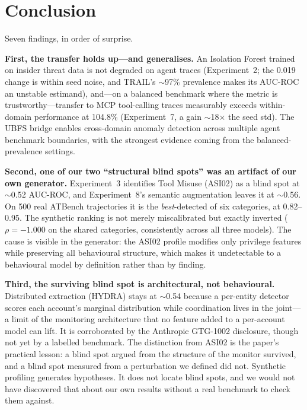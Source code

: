 \documentclass[conference]{IEEEtran}
\begin{document}
\section{Conclusion}
\label{sec:conclusion}

Seven findings, in order of surprise.

\textbf{First, the transfer holds up---and generalises.} An Isolation Forest trained on insider threat data is not degraded on agent traces (Experiment~2; the 0.019 change is within seed noise, and TRAIL's ${\sim}$97\% prevalence makes its AUC-ROC an unstable estimand), and---on a balanced benchmark where the metric is trustworthy---transfer to MCP tool-calling traces measurably exceeds within-domain performance at 104.8\% (Experiment~7, a gain ${\sim}$18$\times$ the seed std). The UBFS bridge enables cross-domain anomaly detection across multiple agent benchmark boundaries, with the strongest evidence coming from the balanced-prevalence settings.

\textbf{Second, one of our two ``structural blind spots'' was an artifact of our own generator.} Experiment~3 identifies Tool Misuse (ASI02) as a blind spot at ${\sim}$0.52 AUC-ROC, and Experiment~8's semantic augmentation leaves it at ${\sim}$0.56. On 500 real ATBench trajectories it is the \emph{best}-detected of six categories, at 0.82--0.95. The synthetic ranking is not merely miscalibrated but exactly inverted ($\rho = -1.000$ on the shared categories, consistently across all three models). The cause is visible in the generator: the ASI02 profile modifies only privilege features while preserving all behavioural structure, which makes it undetectable to a behavioural model by definition rather than by finding.

\textbf{Third, the surviving blind spot is architectural, not behavioural.} Distributed extraction (HYDRA) stays at ${\sim}$0.54 because a per-entity detector scores each account's marginal distribution while coordination lives in the joint---a limit of the monitoring architecture that no feature added to a per-account model can lift. It is corroborated by the Anthropic GTG-1002 disclosure, though not yet by a labelled benchmark. The distinction from ASI02 is the paper's practical lesson: a blind spot argued from the structure of the monitor survived, and a blind spot measured from a perturbation we defined did not. Synthetic profiling generates hypotheses. It does not locate blind spots, and we would not have discovered that about our own results without a real benchmark to check them against.
\end{document}
